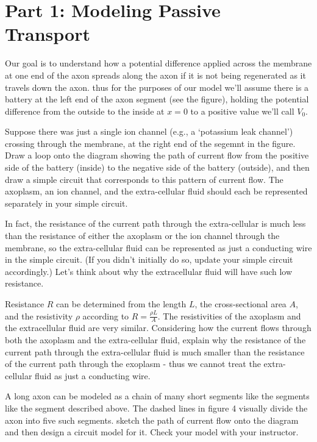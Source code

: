 \section*{Part 1: Modeling Passive Transport}
Our goal is to understand how a potential difference applied across the membrane at one end of the axon spreads along the axon if it is not being regenerated as it travels down the axon.
thus for the purposes of our model we'll assume there is a battery at the left end of the axon segment (see the figure), holding the potential difference from the outside to the inside at $x=0$ to a positive value we'll call $V_{0}$.
\par 
Suppose there was just a single ion channel (e.g., a `potassium leak channel') crossing through the membrane, at the right end of the segemnt in the figure. 
Draw a loop onto the diagram showing the path of current flow from the positive side of the battery (inside) to the negative side of the battery (outside), and then draw a simple circuit that corresponds to this pattern of current flow.
The axoplasm, an ion channel, and the extra-cellular fluid should each be represented separately in your simple circuit.
\par 
In fact, the resistance of the current path through the extra-cellular is much less than the resistance of either the axoplasm or the ion channel through the membrane, so the extra-cellular fluid can be represented as just a conducting wire in the simple circuit.
(If you didn't initially do so, update your simple circuit accordingly.) 
Let's think about why the extracellular fluid will have such low resistance.
\par 
Resistance $R$ can be determined from the length $L$, the cross-sectional area $A$, and the resistivity $\rho$ according to $R = \frac{\rho L}{A}$.
The resistivities of the axoplasm and the extracellular fluid are very similar.
Considering how the current flows through both the axoplasm and the extra-cellular fluid, explain why the resistance of the current path through the extra-cellular fluid is much smaller than the resistance of the current path through the exoplasm - thus we cannot treat the extra-cellular fluid as just a conducting wire.
\par 
A long axon can be modeled as a chain of many short segments like the segments like the segment described above.
The dashed lines in figure 4 visually divide the axon into five such segments.
sketch the path of current flow onto the diagram and then design a circuit model for it.
Check your model with your instructor.

